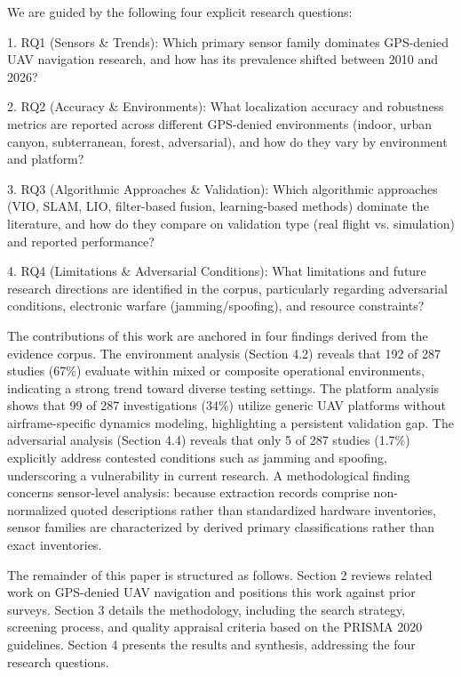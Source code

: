 \documentclass[conference]{IEEEtran}
\begin{document}
We are guided by the following four explicit research questions:

1. RQ1 (Sensors \& Trends): Which primary sensor family dominates GPS-denied UAV navigation research, and how has its prevalence shifted between 2010 and 2026?

2. RQ2 (Accuracy \& Environments): What localization accuracy and robustness metrics are reported across different GPS-denied environments (indoor, urban canyon, subterranean, forest, adversarial), and how do they vary by environment and platform?

3. RQ3 (Algorithmic Approaches \& Validation): Which algorithmic approaches (VIO, SLAM, LIO, filter-based fusion, learning-based methods) dominate the literature, and how do they compare on validation type (real flight vs. simulation) and reported performance?

4. RQ4 (Limitations \& Adversarial Conditions): What limitations and future research directions are identified in the corpus, particularly regarding adversarial conditions, electronic warfare (jamming/spoofing), and resource constraints?


The contributions of this work are anchored in four findings derived from the evidence corpus. The environment analysis (Section 4.2) reveals that 192 of 287 studies (67\%) evaluate within mixed or composite operational environments, indicating a strong trend toward diverse testing settings. The platform analysis shows that 99 of 287 investigations (34\%) utilize generic UAV platforms without airframe-specific dynamics modeling, highlighting a persistent validation gap. The adversarial analysis (Section 4.4) reveals that only 5 of 287 studies (1.7\%) explicitly address contested conditions such as jamming and spoofing, underscoring a vulnerability in current research. A methodological finding concerns sensor-level analysis: because extraction records comprise non-normalized quoted descriptions rather than standardized hardware inventories, sensor families are characterized by derived primary classifications rather than exact inventories.


The remainder of this paper is structured as follows. Section 2 reviews related work on GPS-denied UAV navigation and positions this work against prior surveys. Section 3 details the methodology, including the search strategy, screening process, and quality appraisal criteria based on the PRISMA 2020 guidelines. Section 4 presents the results and synthesis, addressing the four research questions.
\end{document}
